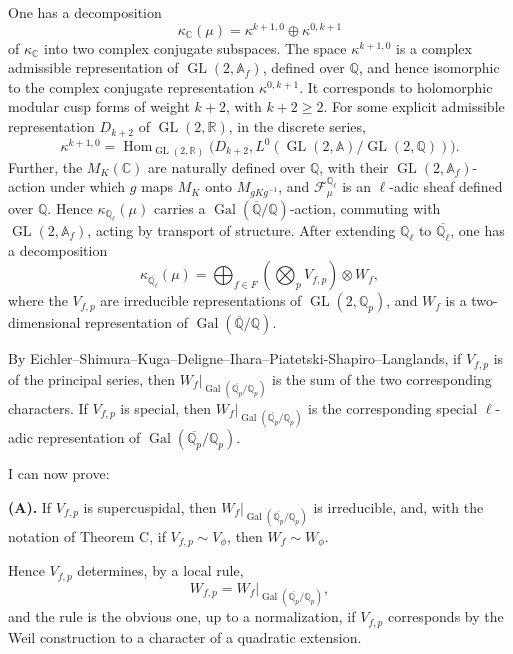 \documentclass[11pt]{article}
\newcommand{\Q}{\mathbb{Q}}
\newcommand{\C}{\mathbb{C}}
\newcommand{\Qp}{\mathbb{Q}_{p}}
\newcommand{\Ql}{\mathbb{Q}_{\ell}}
\newcommand{\Af}{\mathbb{A}_{f}}
\newcommand{\Gal}{\operatorname{Gal}}
\newcommand{\Hom}{\operatorname{Hom}}
\newcommand{\GL}{\operatorname{GL}}
\begin{document}
One has a decomposition
\[
\kappa_{\C}(\mu)=\kappa^{k+1,0}\oplus\kappa^{0,k+1}
\]
of \(\kappa_{\C}\) into two complex conjugate subspaces. The space \(\kappa^{k+1,0}\) is a complex admissible representation of \(\GL(2,\Af)\), defined over \(\Q\), and hence isomorphic to the complex conjugate representation \(\kappa^{0,k+1}\). It corresponds to holomorphic modular cusp forms of weight \(k+2\), with \(k+2\geq2\). For some explicit admissible representation \(D_{k+2}\) of \(\GL(2,\mathbb R)\), in the discrete series,
\[
\kappa^{k+1,0}=
\Hom_{\GL(2,\mathbb R)}
\bigl(D_{k+2},L^0(\GL(2,\mathbb A)/\GL(2,\Q))\bigr).
\]
Further, the \(M_K(\C)\) are naturally defined over \(\Q\), with their \(\GL(2,\Af)\)-action under which \(g\) maps \(M_K\) onto \(M_{gKg^{-1}}\), and \(\mathcal F_{\mu}^{\Ql}\) is an \(\ell\)-adic sheaf defined over \(\Q\). Hence \(\kappa_{\Ql}(\mu)\) carries a \(\Gal(\overline{\Q}/\Q)\)-action, commuting with \(\GL(2,\Af)\), acting by transport of structure. After extending \(\Ql\) to \(\overline{\Ql}\), one has a decomposition
\[
\kappa_{\overline{\Ql}}(\mu)=
\bigoplus_{f\in F}\left(\bigotimes_p V_{f,p}\right)\otimes W_f,
\]
where the \(V_{f,p}\) are irreducible representations of \(\GL(2,\Qp)\), and \(W_f\) is a two-dimensional representation of \(\Gal(\overline{\Q}/\Q)\).

By Eichler--Shimura--Kuga--Deligne--Ihara--Piatetski-Shapiro--Langlands, if \(V_{f,p}\) is of the principal series, then \(W_f|_{\Gal(\overline{\Qp}/\Qp)}\) is the sum of the two corresponding characters. If \(V_{f,p}\) is special, then \(W_f|_{\Gal(\overline{\Qp}/\Qp)}\) is the corresponding special \(\ell\)-adic representation of \(\Gal(\overline{\Qp}/\Qp)\).

I can now prove:

\textbf{(A).} If \(V_{f,p}\) is supercuspidal, then \(W_f|_{\Gal(\overline{\Qp}/\Qp)}\) is irreducible, and, with the notation of Theorem C, if \(V_{f,p}\sim V_{\phi}\), then \(W_f\sim W_{\phi}\).

Hence \(V_{f,p}\) determines, by a local rule,
\[
W_{f,p}=W_f|_{\Gal(\overline{\Qp}/\Qp)},
\]
and the rule is the obvious one, up to a normalization, if \(V_{f,p}\) corresponds by the Weil construction to a character of a quadratic extension.
\end{document}
